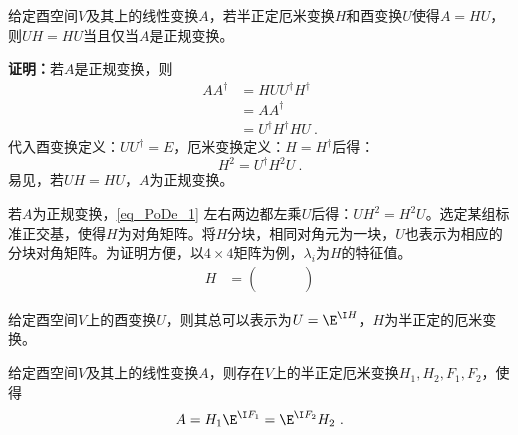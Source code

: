 \begin{theorem}{}
给定酉空间$V$及其上的线性变换$A$，若半正定厄米变换$H$和酉变换$U$使得$A=HU$，则$UH=HU$当且仅当$A$是正规变换。
\end{theorem}
\textbf{证明：}若$A$是正规变换，则
\begin{equation}
\begin{aligned}
AA^{\dagger}&=HUU^{\dagger}H^{\dagger}\\
&=AA^{\dagger}\\
&=U^{\dagger}H^{\dagger}HU~.
\end{aligned}
\end{equation}
代入酉变换定义：$UU^{\dagger}=E$，厄米变换定义：$H=H^{\dagger}$后得：
\begin{equation}\label{eq_PoDe_1}
H^2=U^{\dagger}H^2U~.
\end{equation}
易见，若$UH=HU$，$A$为正规变换。

若$A$为正规变换，\autoref{eq_PoDe_1} 左右两边都左乘$U$后得：$UH^2=H^2U$。选定某组标准正交基，使得$H$为对角矩阵。将$H$分块，相同对角元为一块，$U$也表示为相应的分块对角矩阵。为证明方便，以$4\times 4$矩阵为例，$\lambda_i$为$H$的特征值。
\begin{equation}
\begin{aligned}
H&=\begin{pmatrix}
  &  &  & \\
  &  &  & \\
  &  &  & \\
  &  &  &
\end{pmatrix}
\end{aligned}
\end{equation}

\begin{theorem}{}
给定酉空间$V$上的酉变换$U$，则其总可以表示为$U=\E^{\I H}$，$H$为半正定的厄米变换。
\end{theorem}
\begin{corollary}{}
给定酉空间$V$及其上的线性变换$A$，则存在$V$上的半正定厄米变换$H_1,H_2,F_1,F_2$，使得
\begin{equation}
A=H_1\E^{\I F_1}=\E^{\I F_2}H_2~.
\end{equation}
\end{corollary}
